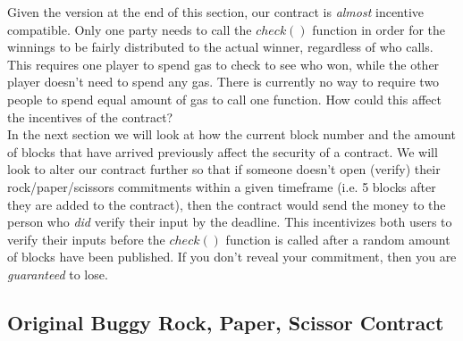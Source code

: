 \documentclass[10pt,twocolumn,letterpaper]{article}
\begin{document}

Given the version at the end of this section, our contract is \textit{almost} incentive compatible. Only one party needs to call the $check()$ function in order for the winnings to be fairly distributed to the actual winner, regardless of who calls. This requires one player to spend gas to check to see who won, while the other player doesn't need to spend any gas. There is currently no way to require two people to spend equal amount of gas to call one function. How could this affect the incentives of the contract? \\

In the next section we will look at how the current block number and the amount of blocks that have arrived previously affect the security of a contract. We will look to alter our contract further so that if someone doesn't open (verify) their rock/paper/scissors commitments within a given timeframe (i.e. 5 blocks after they are added to the contract), then the contract would send the money to the person who \textit{did} verify their input by the deadline. This incentivizes both users to verify their inputs before the $check()$ function is called after a random amount of blocks have been published. If you don't reveal your commitment, then you are \textit{guaranteed} to lose.


\subsection{Original Buggy Rock, Paper, Scissor Contract}
\end{document}

